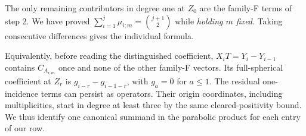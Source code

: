 The only remaining contributors in degree one at \(Z_0\) are the family-F terms of step 2. We have proved \(\sum_{i=1}^j\mu_{i;m}=\binom{j+1}{2}\) while \emph{holding \(m\) fixed}. Taking consecutive differences gives the individual formula.

Equivalently, before reading the distinguished coefficient, \(X_iT=Y_i-Y_{i-1}\) contains \(C_{A_{i;m}}\) once and none of the other family-F vectors. Its full-spherical coefficient at \(Z_r\) is \(g_{i-r}-g_{i-1-r}\), with \(g_a=0\) for \(a\le1\). The residual one-incidence terms can persist as operators. Their origin coordinates, including multiplicities, start in degree at least three by the same cleared-positivity bound. We thus identify one canonical summand in the parabolic product for each entry of our row.
\label{partial:end}
\par\endgroup
